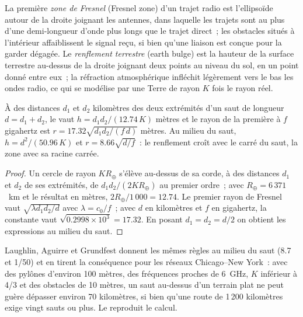 \begin{definition}\label{def:nw:long-haul-wireless:fresnel}
La première \emph{zone de Fresnel} (Fresnel zone) d'un trajet radio est l'ellipsoïde autour de la droite joignant les antennes, dans laquelle
les trajets sont au plus d'une demi-longueur d'onde plus longs que le trajet direct~; les obstacles situés à l'intérieur affaiblissent le signal reçu, si bien qu'une liaison est conçue pour la garder
dégagée. Le \emph{renflement terrestre} (earth bulge) est la hauteur de la surface terrestre au-dessus de la droite joignant deux points au niveau du
sol, en un point donné entre eux~; la réfraction atmosphérique infléchit légèrement vers le bas les ondes radio, ce qui se modélise par une Terre de rayon
$K$ fois le rayon réel.
\end{definition}

\begin{proposition}\label{prop:nw:long-haul-wireless:geometry}
À des distances $d_1$ et $d_2$ kilomètres des deux extrémités d'un saut de longueur $d = d_1 + d_2$, le  vaut
$h = d_1 d_2 / (12.74\,K)$ mètres et le rayon de la première  à $f$ gigahertz est $r = 17.32\sqrt{d_1 d_2 / (f\,d)}$ mètres. Au
milieu du saut, $h = d^2/(50.96\,K)$ et $r = 8.66\sqrt{d/f}$~: le renflement croît avec le carré du saut, la zone avec sa racine carrée.
\end{proposition}

\begin{proof}
Un cercle de rayon $K R_\oplus$ s'élève au-dessus de sa corde, à des distances $d_1$ et $d_2$ de ses extrémités, de $d_1 d_2/(2 K R_\oplus)$ au premier ordre~;
avec $R_\oplus = 6\,371$~km et le résultat en mètres, $2 R_\oplus/1\,000 = 12.74$. Le premier rayon de Fresnel vaut $\sqrt{\lambda d_1 d_2/d}$ avec
$\lambda = c_0/f$~; avec $d$ en kilomètres et $f$ en gigahertz, la constante vaut $\sqrt{0.2998 \times 10^3} = 17.32$. En posant $d_1 = d_2 = d/2$
on obtient les expressions au milieu du saut.
\end{proof}

Laughlin, Aguirre et Grundfest donnent les mêmes règles au milieu du saut (8.7 et 1/50) et en tirent la conséquence pour les réseaux Chicago--New York~: avec
des pylônes d'environ 100 mètres, des fréquences proches de \qty{6}{\giga\hertz}, $K$ inférieur à 4/3 et des obstacles de 10 mètres, un saut au-dessus d'un terrain plat ne peut guère
dépasser environ 70 kilomètres, si bien qu'une route de 1\,200 kilomètres exige vingt sauts ou plus. Le 
reproduit le calcul.

